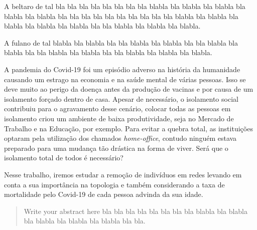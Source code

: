 \documentclass[12pt]{abnt-fisica11}%
\begin{document}
  \begin{agradecimentos}
  A beltaro de tal bla bla bla bla bla bla bla bla blabla bla blabla bla blabla bla blabla bla blabla bla bla
  bla bla bla bla bla bla bla bla blabla bla blabla bla blabla bla blabla bla 
blabla bla bla  blabla bla blabla bla blabla.
  
  A fulano de tal  blabla bla blabla bla bla  blabla bla blabla bla bla  blabla 
bla blabla bla bla  blabla bla blabla bla bla blabla bla blabla bla blabla.
  \end{agradecimentos}
  \begin{resumo}
    A pandemia do Covid-19 foi um episódio adverso na história da humanidade causando um estrago na economia e na saúde mental de várias pessoas. Isso se deve muito ao perigo da doença antes da produção de vacinas e por causa de um isolamento forçado dentro de casa. Apesar de necessário, o isolamento social contribuiu para o agravamento desse cenário, colocar todas as pessoas em isolamento criou um ambiente de baixa produtividade, seja no Mercado de Trabalho e na Educação, por exemplo. Para evitar a quebra total, as instituições optaram pela utilização dos chamados \textit{home-office}, contudo ninguém estava preparado para uma mudança tão drástica na forma de viver. Será que o isolamento total de todos é necessário?

    Nesse trabalho, iremos estudar a remoção de indivíduos em redes levando em conta a sua importância na topologia e também considerando a taxa de mortalidade pelo Covid-19 de cada pessoa advinda da sua idade.
  \end{resumo}
  
  \begin{abstract}
  Write your abstract here bla bla bla bla bla bla bla bla blabla bla blabla bla 
blabla bla blabla bla blabla bla bla.
  \end{abstract}

\listadefiguras%
 \listadegraficos
  \listadetabelas%
  
  \listadesiglas%
 \listadesimbolos
 
\end{document}
